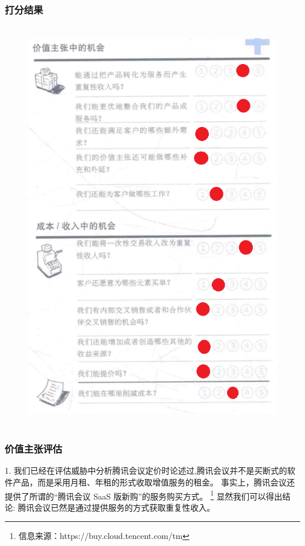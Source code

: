 \documentclass[a4paper,12pt]{article}
\begin{document}
    \subsubsection{打分结果}
    \begin{figure}[htbp]
        \centering
        \includegraphics[width=12cm,height=18cm]{png/评估机会}
    \end{figure}
    \clearpage %


    \subsubsection{价值主张评估}


    1.
    我们已经在评估威胁中分析腾讯会议定价时论述过,腾讯会议并不是买断式的软件产品，而是采用月租、年租的形式收取增值服务的租金。
    事实上，腾讯会议还提供了所谓的“腾讯会议 SaaS 版新购”的服务购买方式。
    \footnote{信息来源：https://buy.cloud.tencent.com/tm}
    显然我们可以得出结论: 腾讯会议已然是通过提供服务的方式获取重复性收入。
\end{document}
